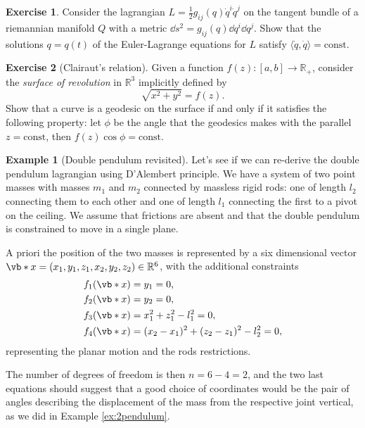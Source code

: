 \documentclass[english,fontsize=11pt,paper=b5]{scrbook}
\theoremstyle{definition}
\newtheorem{example}{Example}[chapter]
\newtheorem{exercise}{Exercise}[chapter]
\begin{document}
    \begin{exercise}
      Consider the lagrangian $L=\frac12 g_{ij}(q)\dot q^i \dot q^j$ on the tangent bundle of a riemannian manifold $Q$ with a metric $\dd s^2 = g_{ij}(q)\dd q^i \dd q^j$.
      Show that the solutions $q=q(t)$ of the Euler-Lagrange equations for $L$ satisfy $\langle\dot q, \dot q\rangle= \mathrm{const}$.
    \end{exercise}

    \begin{exercise}[Clairaut's relation]
      Given a function $f(z): [a,b] \to \mathbb{R}_+$, consider the \emph{surface of revolution} in $\mathbb{R}^3$ implicitly defined by
      \begin{equation}
        \sqrt{x^2 + y^2} = f(z).
      \end{equation}
      Show that a curve is a geodesic on the surface if and only if it satisfies the following property: let $\phi$ be the angle that the geodesics makes with the parallel $z=\mathrm{const}$, then $f(z)\cos \phi = \mathrm{const}$.
    \end{exercise}

    \begin{example}[Double pendulum revisited]
      Let's see if we can re-derive the double pendulum lagrangian using D'Alembert principle.
      We have a system of two point masses with masses $m_1$ and $m_2$ connected by massless rigid rods: one of length $l_2$ connecting them to each other and one of length $l_1$ connecting the first to a pivot on the ceiling. We assume that frictions are absent and that the double pendulum is constrained to move in a single plane.

      A priori the position of the two masses is represented by a six dimensional vector
      $\vb*{x} = (x_1, y_1, z_1, x_2, y_2, z_2)\in\mathbb{R}^6$, with the additional constraints
      \begin{align}
        f_1(\vb*{x}) & = y_1 = 0,                               \\
        f_2(\vb*{x}) & = y_2 = 0,                               \\
        f_3(\vb*{x}) & = x_1^2 + z_1^2 - l_1^2 = 0,             \\
        f_4(\vb*{x}) & = (x_2-x_1)^2 + (z_2-z_1)^2 - l_2^2 = 0,
      \end{align}
      representing the planar motion and the rods restrictions.

      The number of degrees of freedom is then $n = 6 -4 = 2$, and the two last equations should suggest that a good choice of coordinates would be the pair of angles describing the displacement of the mass from the respective joint vertical, as we did in Example \ref{ex:2pendulum}.
    \end{example}
\end{document}
